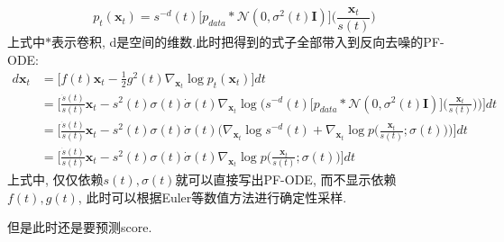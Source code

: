 $$
p_{t}(\mathbf{x}_{t}) = s^{-d}(t)\big[p_{data}\ast \mathcal{N}(0, \sigma^{2}(t)\mathbf{I})\big]\bigg(\frac{\mathbf{x}_{t}}{s(t)}\bigg)
$$
上式中$\ast$表示卷积, d是空间的维数.此时把得到的式子全部带入到反向去噪的PF-ODE:
$$
\begin{aligned}
    d\mathbf{x}_{t} &= \bigg[f(t)\mathbf{x}_{t}-\frac{1}{2}g^{2}(t)\nabla_{\mathbf{x}_{t}}\log p_{t}(\mathbf{x}_{t})\bigg]dt \\
    &=\bigg[\frac{\dot{s}(t)}{s(t)}\mathbf{x}_{t}-s^{2}(t)\sigma(t)\dot{\sigma}(t)
    \nabla_{\mathbf{x}_{t}}\log\bigg(
        s^{-d}(t)\big[p_{data}\ast \mathcal{N}(0, \sigma^{2}(t)\mathbf{I})\big]\bigg(\frac{\mathbf{x}_{t}}{s(t)}\bigg)
        \bigg)\bigg]dt \\
    &=\bigg[\frac{\dot{s}(t)}{s(t)}\mathbf{x}_{t}-s^{2}(t)\sigma(t)\dot{\sigma}(t)
    \bigg(
        \nabla_{\mathbf{x}_{t}}\log s^{-d}(t) + \nabla_{\mathbf{x}_{t}}\log p\bigg(\frac{\mathbf{x}_{t}}{s(t)};\sigma(t)\bigg)
        \bigg)\bigg]dt \\
    &=\bigg[\frac{\dot{s}(t)}{s(t)}\mathbf{x}_{t}-s^{2}(t)\sigma(t)\dot{\sigma}(t)
    \nabla_{\mathbf{x}_{t}}\log p\bigg(\frac{\mathbf{x}_{t}}{s(t)};\sigma(t)\bigg)\bigg]dt
\end{aligned}
$$
上式中, 仅仅依赖$s(t), \sigma(t)$就可以直接写出PF-ODE,  而不显示依赖$f(t), g(t)$, 此时可以根据Euler等数值方法进行确定性采样.

但是此时还是要预测score.


